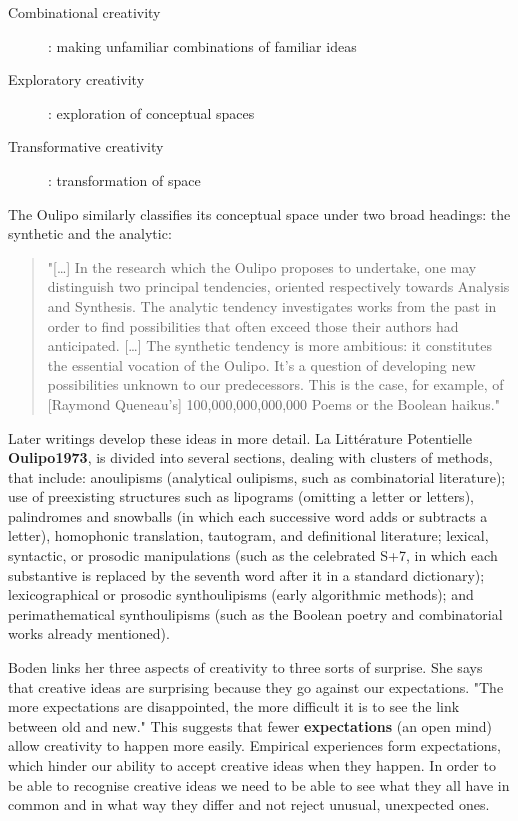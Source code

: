 \begin{description}
  \item [Combinational creativity]: making unfamiliar combinations of familiar ideas
  \item [Exploratory creativity]: exploration of conceptual spaces
  \item [Transformative creativity]: transformation of space
\end{description}

The Oulipo similarly classifies its conceptual space under two broad headings: the synthetic and the analytic:

\begin{quote}
  "[…] In the research which the Oulipo proposes to undertake, one may distinguish two principal tendencies, oriented respectively towards Analysis and Synthesis. The analytic tendency investigates works from the past in order to find possibilities that often exceed those their authors had anticipated. […] The synthetic tendency is more ambitious: it constitutes the essential vocation of the Oulipo. It's a question of developing new possibilities unknown to our predecessors. This is the case, for example, of [Raymond Queneau's] 100,000,000,000,000 Poems or the Boolean haikus." \citep[p.27]{Motte2007}
\end{quote}

Later writings develop these ideas in more detail. La Littérature Potentielle \textbf{Oulipo1973}, is divided into several sections, dealing with clusters of methods, that include: anoulipisms (analytical oulipisms, such as combinatorial literature); use of preexisting structures such as lipograms (omitting a letter or letters), palindromes and snowballs (in which each successive word adds or subtracts a letter), homophonic translation, tautogram, and definitional literature; lexical, syntactic, or prosodic manipulations (such as the celebrated S+7, in which each substantive is replaced by the seventh word after it in a standard dictionary); lexicographical or prosodic synthoulipisms (early algorithmic methods); and perimathematical synthoulipisms (such as the Boolean poetry and combinatorial works already mentioned).

Boden links her three aspects of creativity to three sorts of surprise. She says that creative ideas are surprising because they go against our expectations. "The more expectations are disappointed, the more difficult it is to see the link between old and new." \citep[p.84]{Boden2003} This suggests that fewer \textbf{expectations} (an open mind) allow creativity to happen more easily. Empirical experiences form expectations, which hinder our ability to accept creative ideas when they happen. In order to be able to recognise creative ideas we need to be able to see what they all have in common and in what way they differ and not reject unusual, unexpected ones.


